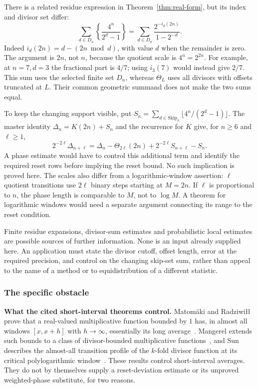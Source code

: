 There is a related residue expression in
Theorem~\ref{thm:real-form}, but its index and divisor set differ:
\[
 \sum_{d\in D_n}\left\{\frac{4^n}{2^d-1}\right\}
 =\sum_{d\in D_n}\frac{2^{-i_d(2n)}}{1-2^{-d}}.
\]
Indeed $i_d(2n)=d-(2n\bmod d)$, with value $d$ when the
remainder is zero.  The argument is $2n$, not $n$, because the
quotient scale is $4^n=2^{2n}$.  For example, at $n=7,d=3$ the
fractional part is $4/7$; using $i_3(7)$ would instead give $2/7$.
This sum uses the selected finite set $D_n$, whereas $\Theta_L$
uses all divisors with offsets truncated at $L$.  Their common
geometric summand does not make the two sums equal.

To keep the changing support visible, put
$S_n=\sum_{d\in\mathrm{Skip}_n}\lfloor4^n/(2^d-1)\rfloor$.
The master identity $\Delta_n=K(2n)+S_n$ and the recurrence for $K$
give, for $n\ge6$ and $\ell\ge1$,
\[
 2^{-2\ell}\Delta_{n+\ell}
 =\Delta_n-\Theta_{2\ell}(2n)
       +2^{-2\ell}S_{n+\ell}-S_n.
\]
A phase estimate would have to control this additional term and
identify the required reset rows before implying the reset bound.
No such implication is proved here.  The scales also differ from
a logarithmic-window assertion: $\ell$ quotient transitions use
$2\ell$ binary steps starting at $M=2n$.  If $\ell$ is proportional
to $n$, the phase length is comparable to $M$, not to $\log M$.
A theorem for logarithmic windows would need a separate argument
connecting its range to the reset condition.

Finite residue expansions, divisor-sum estimates and probabilistic
local estimates are possible sources of further information.  None
is an input already supplied here.  An application must state the
divisor cutoff, offset length, error at the required precision, and
control on the changing skip-set sum, rather than appeal to the
name of a method or to equidistribution of a different statistic.

\subsubsection*{The specific obstacle}

\textbf{What the cited short-interval theorems control.}  Matom\"aki and
Radziwi\l{}\l{} prove that a real-valued multiplicative function bounded by $1$ has, in almost all
windows $[x,x+h]$ with $h\to\infty$, essentially its long
average~\cite[Theorem~1, pp.~1--2]{matomakiradziwill}.  Mangerel extends such bounds to a class of
divisor-bounded multiplicative
functions~\cite[Theorem~1.7, p.~7, and Corollary~1.8, pp.~7--8]{mangerel2021}, and Sun describes the
almost-all transition profile of the $k$-fold divisor function at its critical polylogarithmic
window~\cite[Theorem~1.1 and Corollary~1.2, p.~3]{sun2026}.  These results control short-interval averages.  They do not by
themselves supply a reset-deviation estimate or its unproved
weighted-phase substitute, for two reasons.


